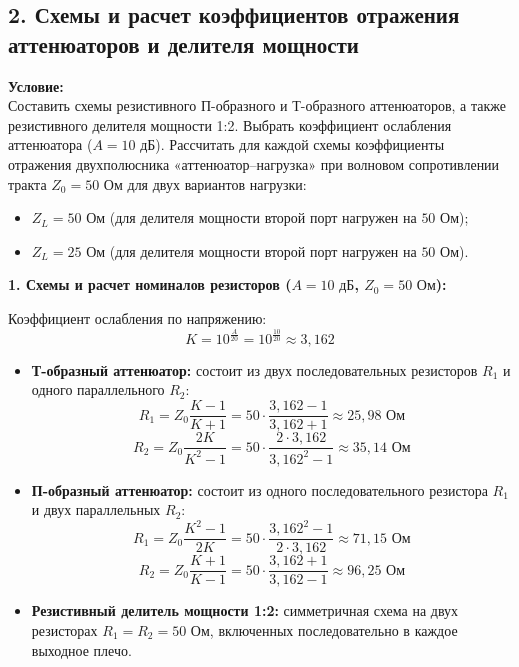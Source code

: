 \subsection*{2. Схемы и расчет коэффициентов отражения аттенюаторов и делителя мощности}

\textbf{Условие:} \\
Составить схемы резистивного П-образного и Т-образного аттенюаторов, а также резистивного делителя мощности 1:2. Выбрать коэффициент ослабления аттенюатора ($A = 10\text{ дБ}$). Рассчитать для каждой схемы коэффициенты отражения двухполюсника «аттенюатор--нагрузка» при волновом сопротивлении тракта $Z_0 = 50\text{ Ом}$ для двух вариантов нагрузки:
\begin{itemize}
    \item $Z_L = 50\text{ Ом}$ (для делителя мощности второй порт нагружен на $50\text{ Ом}$);
    \item $Z_L = 25\text{ Ом}$ (для делителя мощности второй порт нагружен на $50\text{ Ом}$).
\end{itemize}

\vspace{0.3cm}
\textbf{1. Схемы и расчет номиналов резисторов ($A = 10\text{ дБ}$, $Z_0 = 50\text{ Ом}$):}

Коэффициент ослабления по напряжению:
$$K = 10^{\frac{A}{20}} = 10^{\frac{10}{20}} \approx 3{,}162$$

\begin{itemize}
    \item \textbf{Т-образный аттенюатор:} состоит из двух последовательных резисторов $R_1$ и одного параллельного $R_2$:
    $$R_1 = Z_0 \frac{K - 1}{K + 1} = 50 \cdot \frac{3{,}162 - 1}{3{,}162 + 1} \approx 25{,}98\text{ Ом}$$
    $$R_2 = Z_0 \frac{2K}{K^2 - 1} = 50 \cdot \frac{2 \cdot 3{,}162}{3{,}162^2 - 1} \approx 35{,}14\text{ Ом}$$

    \item \textbf{П-образный аттенюатор:} состоит из одного последовательного резистора $R_1$ и двух параллельных $R_2$:
    $$R_1 = Z_0 \frac{K^2 - 1}{2K} = 50 \cdot \frac{3{,}162^2 - 1}{2 \cdot 3{,}162} \approx 71{,}15\text{ Ом}$$
    $$R_2 = Z_0 \frac{K + 1}{K - 1} = 50 \cdot \frac{3{,}162 + 1}{3{,}162 - 1} \approx 96{,}25\text{ Ом}$$

    \item \textbf{Резистивный делитель мощности 1:2:} симметричная схема на двух резисторах $R_1 = R_2 = 50\text{ Ом}$, включенных последовательно в каждое выходное плечо.
\end{itemize}

